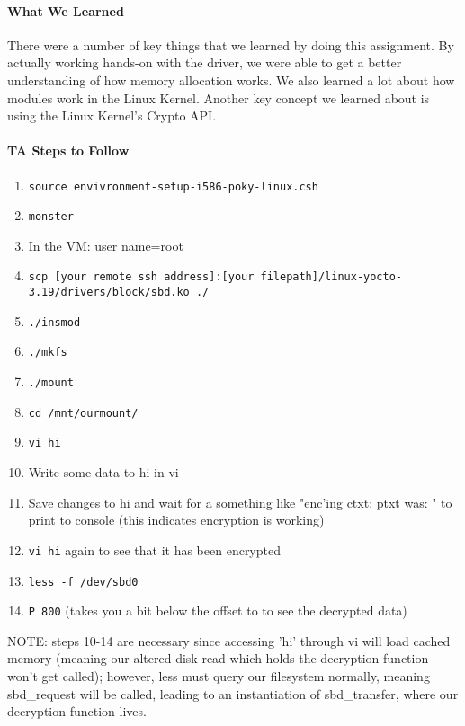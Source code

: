 \documentclass[titlepage,draftclsnofoot,onecolumn]{article}
\begin{document}
\paragraph{What We Learned}
There were a number of key things that we learned by doing this assignment. By actually working hands-on with the driver, we were able to get a better understanding of how memory allocation works. We also learned a lot about how modules work in the Linux Kernel. Another key concept we learned about is using the Linux Kernel's Crypto API.

\paragraph{TA Steps to Follow}


\begin{enumerate}
	\item \texttt{source envivronment-setup-i586-poky-linux.csh}
	\item \texttt{monster}
	\item In the VM: user name=root
	\item \texttt{scp [your remote ssh address]:[your filepath]/linux-yocto-3.19/drivers/block/sbd.ko ./}
	\item \texttt{./insmod}
	\item \texttt{./mkfs}
	\item \texttt{./mount}
	\item \texttt{cd /mnt/ourmount/}
	\item \texttt{vi hi}
	\item Write some data to hi in vi
	\item Save changes to hi and wait for a something like "enc'ing ctxt: ptxt was: " to print to console (this indicates encryption is working)
	\item \texttt{vi hi} again to see that it has been encrypted
	\item \texttt{less -f /dev/sbd0}
	\item \texttt{P 800} (takes you a bit below the offset to to see the decrypted data)
  \end{enumerate}
  
  NOTE: steps 10-14 are necessary since accessing 'hi' through vi will load cached memory (meaning our altered disk read which holds the decryption function won't get called); however, less must query our filesystem normally, meaning sbd\_request will be called, leading to an instantiation of sbd\_transfer, where our decryption function lives.
\end{document}
